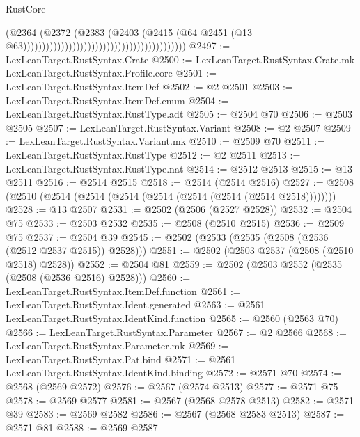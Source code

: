 \begin{lexlean}{RustCore}
\begin{coremodule}
                                                                            (@2364
                                                                              (@2372
                                                                                (@2383
                                                                                  (@2403
                                                                                    (@2415
                                                                                      (@64
                                                                                        @2451
                                                                                        (@13
                                                                                          @63)))))))))))))))))))))))))))))))))))))))))))
@2497 := LexLeanTarget.RustSyntax.Crate
@2500 := LexLeanTarget.RustSyntax.Crate.mk LexLeanTarget.RustSyntax.Profile.core
@2501 := LexLeanTarget.RustSyntax.ItemDef
@2502 := @2 @2501
@2503 := LexLeanTarget.RustSyntax.ItemDef.enum
@2504 := LexLeanTarget.RustSyntax.RustType.adt
@2505 := @2504 @70
@2506 := @2503 @2505
@2507 := LexLeanTarget.RustSyntax.Variant
@2508 := @2 @2507
@2509 := LexLeanTarget.RustSyntax.Variant.mk
@2510 := @2509 @70
@2511 := LexLeanTarget.RustSyntax.RustType
@2512 := @2 @2511
@2513 := LexLeanTarget.RustSyntax.RustType.nat
@2514 := @2512 @2513
@2515 := @13 @2511
@2516 := @2514 @2515
@2518 := @2514 (@2514 @2516)
@2527 := @2508 (@2510 (@2514 (@2514 (@2514 (@2514 (@2514 (@2514 (@2514 @2518))))))))
@2528 := @13 @2507
@2531 := @2502 (@2506 (@2527 @2528))
@2532 := @2504 @75
@2533 := @2503 @2532
@2535 := @2508 (@2510 @2515)
@2536 := @2509 @75
@2537 := @2504 @39
@2545 := @2502 (@2533 (@2535 (@2508 (@2536 (@2512 @2537 @2515)) @2528)))
@2551 := @2502 (@2503 @2537 (@2508 (@2510 @2518) @2528))
@2552 := @2504 @81
@2559 := @2502 (@2503 @2552 (@2535 (@2508 (@2536 @2516) @2528)))
@2560 := LexLeanTarget.RustSyntax.ItemDef.function
@2561 := LexLeanTarget.RustSyntax.Ident.generated
@2563 := @2561 LexLeanTarget.RustSyntax.IdentKind.function
@2565 := @2560 (@2563 @70)
@2566 := LexLeanTarget.RustSyntax.Parameter
@2567 := @2 @2566
@2568 := LexLeanTarget.RustSyntax.Parameter.mk
@2569 := LexLeanTarget.RustSyntax.Pat.bind
@2571 := @2561 LexLeanTarget.RustSyntax.IdentKind.binding
@2572 := @2571 @70
@2574 := @2568 (@2569 @2572)
@2576 := @2567 (@2574 @2513)
@2577 := @2571 @75
@2578 := @2569 @2577
@2581 := @2567 (@2568 @2578 @2513)
@2582 := @2571 @39
@2583 := @2569 @2582
@2586 := @2567 (@2568 @2583 @2513)
@2587 := @2571 @81
@2588 := @2569 @2587

\end{coremodule}
\end{lexlean}

